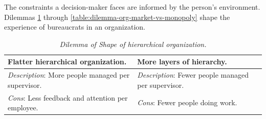 The constraints a decision-maker faces are informed by the person's environment. Dilemmas \ref{table:dilemma-org-people-per-supervisor} through \ref{table:dilemma-org-market-vs-monopoly} shape the experience of bureaucrats in an organization.

\begin{center}
\begin{table}[H] %
\begin{tabular}{ | m{\dilemmatablewidth}| m{\dilemmatablewidth} | } 
  \hline
  \textbf{Flatter hierarchical organization.} &
  \textbf{More layers of hierarchy.} \\ 
  \hline
  \textit{Description}: More people managed per supervisor. & 
  \textit{Description}: Fewer people managed per supervisor. \\ 
  \hline
  \textit{Cons}: Less feedback and attention per employee. & 
  \textit{Cons}: Fewer people doing work. \\  
  \hline
\end{tabular}
\caption{
\textit{Dilemma of Shape of hierarchical organization.}
}
\label{table:dilemma-org-people-per-supervisor}
\end{table}
\end{center}



